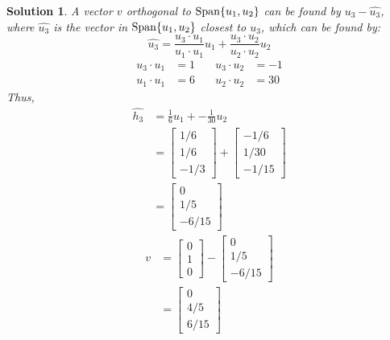 \documentclass[11pt]{scrartcl}
\theoremstyle{dotlessP}
\newtheorem{sol}{Solution}[section]
\theoremstyle{dotlessN}
\DeclarePairedDelimiter\set{\{}{\}}
\newcommand{\spa}[1]{\text{Span}\set*{#1}}
\begin{document}
\begin{sol}
	A vector $v$ orthogonal to $\spa{u_1,u_2}$ can be found by $u_3 - \hat{u_3}$, where $\hat{u_3}$ is the vector in $\spa{u_1,u_2}$ closest to $u_3$, which can be found by:
	\[
		\hat{u_3} = \frac{u_3 \cdot u_1}{u_1 \cdot u_1}u_1 + \frac{u_3 \cdot u_2}{u_2 \cdot u_2}u_2
	\] 
	\begin{align*}
		u_3 \cdot u_1 &= 1 &\quad u_3 \cdot u_2 &= -1 \\
		u_1 \cdot u_1 &= 6 &\quad u_2 \cdot u_2 &= 30
	\end{align*}
	Thus,
	\begin{align*}
		\hat{h_3} &= \frac{1}{6}u_1 + -\frac{1}{30}u_2 \\
				  &= 
				  \begin{bmatrix}
					  1/6 \\
					  1/6 \\
					  -1/3
				  \end{bmatrix} +
				  \begin{bmatrix}
				  	-1/6 \\
					1/30 \\
					-1/15
				  \end{bmatrix} \\
				  &= 
				  \begin{bmatrix}
				  	0 \\
					1/5 \\
					-6/15
				  \end{bmatrix}
	\end{align*}
	\begin{align*}
		v &= 
		\begin{bmatrix}
			0 \\
			1 \\
			0
		\end{bmatrix} -
		\begin{bmatrix}
			0 \\
			1/5 \\
			-6/15
		\end{bmatrix} \\
		  &=
		  \begin{bmatrix}
		  	0 \\
			4/5 \\
			6/15
		  \end{bmatrix}
	\end{align*}
\end{sol}
\end{document}

